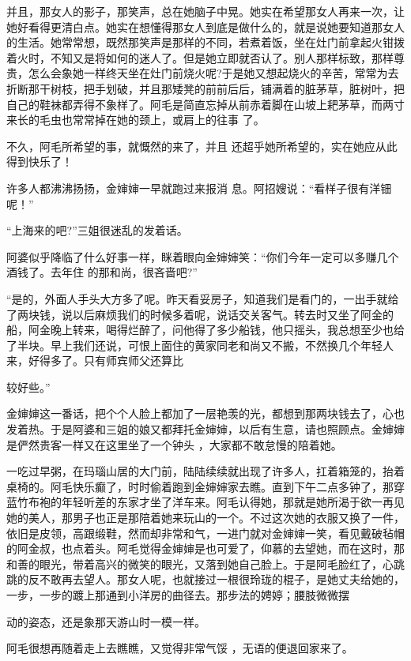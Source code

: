\documentclass{article}
\begin{document}
并且，那女人的影子，那笑声，总在她脑子中晃。她实在希望那女人再来一次，让她好看得更清白点。她实在想懂得那女人到底是做什么的，就是说她要知道那女人的生活。她常常想，既然那笑声是那样的不同，若煮着饭，坐在灶门前拿起火钳拨着火时，不知又是将如何的迷人了。但是她立即就否认了。别人那样标致，那样尊贵，怎么会象她一样终天坐在灶门前烧火呢?于是她又想起烧火的辛苦，常常为去折断那干树枝，把手划破，并且那矮凳的前前后后，铺满着的脏茅草，脏树叶，把自己的鞋袜都弄得不象样了。阿毛是简直忘掉从前赤着脚在山坡上耙茅草，而两寸来长的毛虫也常常掉在她的颈上，或肩上的往事
了。 

\newpage

不久，阿毛所希望的事，就慨然的来了，并且
还超乎她所希望的，实在她应从此得到快乐了！ 


许多人都沸沸扬扬，金婶婶一早就跑过来报消
息。阿招嫂说：“看样子很有洋钿呢！” 


“上海来的吧?”三姐很迷乱的发着话。 

阿婆似乎降临了什么好事一样，眯着眼向金婶婶笑：“你们今年一定可以多赚几个酒钱了。去年住
的那和尚，很吝啬吧?” 

“是的，外面人手头大方多了呢。昨天看妥房子，知道我们是看门的，一出手就给了两块钱，说以后麻烦我们的时候多着呢，说话交关客气。转去时又坐了阿金的船，阿金晚上转来，喝得烂醉了，问他得了多少船钱，他只摇头，我总想至少也给了半块。早上我们还说，可恨上面住的黄家同老和尚又不搬，不然换几个年轻人来，好得多了。只有师宾师父还算比

\newpage
较好些。” 

金婶婶这一番话，把个个人脸上都加了一层艳羡的光，都想到那两块钱去了，心也发着热。于是阿婆和三姐的娘又都拜托金婶婶，以后有生意，请也照顾点。金婶婶是俨然贵客一样又在这里坐了一个钟头
，大家都不敢怠慢的陪着她。 

一吃过早粥，在玛瑙山居的大门前，陆陆续续就出现了许多人，扛着箱笼的，抬着桌椅的。阿毛快乐癫了，时时偷着跑到金婶婶家去瞧。直到下午二点多钟了，那穿蓝竹布袍的年轻听差的东家才坐了洋车来。阿毛认得她，那就是她所渴于欲一再见她的美人，那男子也正是那陪着她来玩山的一个。不过这次她的衣服又换了一件，依旧是皮领，高跟缎鞋，然而却非常和气，一进门就对金婶婶一笑，看见戴破毡帽的阿金叔，也点着头。阿毛觉得金婶婶是也可爱了，仰慕的去望她，而在这时，那和善的眼光，带着高兴的微笑的眼光，又落到她自己脸上。于是阿毛脸红了，心跳跳的反不敢再去望人。那女人呢，也就接过一根很玲珑的棍子，是她丈夫给她的，一步，一步的踱上那通到小洋房的曲径去。那步法的娉婷；腰肢微微摆
\newpage

动的姿态，还是象那天游山时一模一样。 

阿毛很想再随着走上去瞧瞧，又觉得非常气馁
，无语的便退回家来了。 
\end{document}
